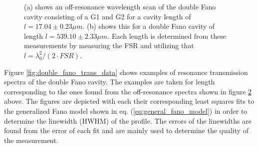 \begin{figure}[h!]
\begin{subfigure}[b]{0.49\textwidth}
        \caption{}
        \label{fig:long_double_fano_FSR}
    \end{subfigure}
    \caption{(a) shows an off-resonance wavelength scan of the double Fano cavity consisting of a G1 and G2 for a cavity length of $l = 17.04 \pm 0.23 \mu m$. (b) shows this for a double Fano cavity of length $l = 539.10 \pm 2.33 \mu m$. Each length is determined from these measurements by measuring the FSR and utilizing that $l = \lambda_0^2/(2\cdot FSR)$.}
    \label{fig:double_fano_fsr_scans}
\end{figure}

Figure \ref{fig:double_fano_trans_data} shows examples of resonance transmission spectra of the double Fano cavity. The examples are taken for length corresponding to the ones found from the off-resonance spectra shown in figure \ref{fig:double_fano_fsr_scans} above. The figures are depicted with each their corresponding least squares fits to the generalized Fano model shown in eq. (\ref{eq:general_fano_model}) in order to determine the linewidth (HWHM) of the profile. The errors of the linewidths are found from the error of each fit and are mainly used to determine the quality of the measurement. 

